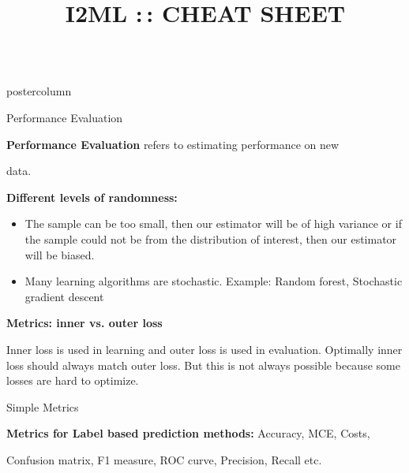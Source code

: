 \documentclass{beamer}
\title{I2ML :\,: CHEAT SHEET} %
\begin{document}
\begin{frame}[fragile]{}
\begin{columns}
	\begin{column}{.31\textwidth}
		\begin{beamercolorbox}[center]{postercolumn}
			\begin{minipage}{.98\textwidth}
				\parbox[t][\columnheight]{\textwidth}{
					\begin{myblock}{Performance Evaluation}

						\begin{codebox}
							\textbf{Performance Evaluation} refers to estimating performance on new
						\end{codebox}
						
						\begin{codebox}
							data.
						\end{codebox}
						
					    \vspace*{1ex}
						
						\begin{codebox}
							\textbf{Different levels of randomness:}
						\end{codebox}
						
						\begin{itemize}[$\bullet$]
						  \setlength{\itemindent}{+.3in}
              \item The sample can be too small, then our estimator will be of high variance or if the sample could not be from the distribution of interest, then our estimator will be biased.
               \item Many learning algorithms are stochastic. Example: Random forest, Stochastic gradient descent
            \end{itemize}
						
						\vspace*{1ex}
	
						\begin{codebox}
							 \textbf{Metrics: inner vs. outer loss}
						\end{codebox}
						Inner loss is used in learning and outer loss is used in evaluation. Optimally inner loss should always match outer loss. But this is not always possible because some losses are hard to optimize. 
				
					\end{myblock}
					\begin{myblock}{Simple Metrics}
					\begin{codebox}
							\textbf{Metrics for Label based prediction methods: }Accuracy, MCE, Costs,
						\end{codebox}
						\begin{codebox}
							 Confusion matrix, F1 measure, ROC curve, Precision, Recall etc.
						\end{codebox}
						

\end{myblock}}
\end{minipage}
\end{beamercolorbox}
\end{column}
\end{columns}
\end{frame}
\end{document}
